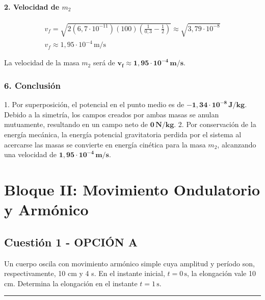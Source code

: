 \paragraph*{2. Velocidad de $m_2$}
\begin{gather}
    v_f = \sqrt{2 (6,7\cdot10^{-11})(100) \left(\frac{1}{0,3} - \frac{1}{2}\right)} \approx \sqrt{3,79 \cdot 10^{-8}} \nonumber \\[8pt]
    v_f \approx 1,95 \cdot 10^{-4} \, \text{m/s}
\end{gather}
\begin{cajaresultado}
    La velocidad de la masa $m_2$ será de $\boldsymbol{v_f \approx 1,95 \cdot 10^{-4} \, \textbf{m/s}}$.
\end{cajaresultado}

\subsubsection*{6. Conclusión}
\begin{cajaconclusion}
    1. Por superposición, el potencial en el punto medio es de $\mathbf{-1,34 \cdot 10^{-8} \, J/kg}$. Debido a la simetría, los campos creados por ambas masas se anulan mutuamente, resultando en un campo neto de $\mathbf{0 \, N/kg}$.
    2. Por conservación de la energía mecánica, la energía potencial gravitatoria perdida por el sistema al acercarse las masas se convierte en energía cinética para la masa $m_2$, alcanzando una velocidad de $\mathbf{1,95 \cdot 10^{-4} \, m/s}$.
\end{cajaconclusion}

\newpage

\section{Bloque II: Movimiento Ondulatorio y Armónico}
\label{sec:mas_2005_sep_cv}

\subsection{Cuestión 1 - OPCIÓN A}
\label{subsec:2A_2005_sep_cv}

\begin{cajaenunciado}
Un cuerpo oscila con movimiento armónico simple cuya amplitud y período son, respectivamente, 10 cm y 4 s. En el instante inicial, $t=0\,\text{s}$, la elongación vale 10 cm. Determina la elongación en el instante $t=1\,\text{s}$.
\end{cajaenunciado}
\hrule

